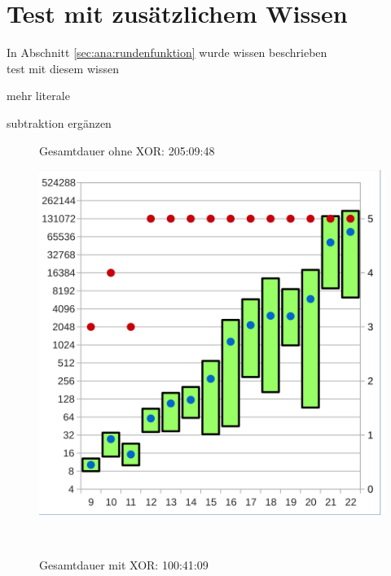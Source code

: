 \section{Test mit zusätzlichem Wissen}

In Abschnitt \ref{sec:ana:rundenfunktion} wurde wissen beschrieben\\
test mit diesem wissen

mehr literale

subtraktion ergänzen


\begin{figure}[!h]
  \centering
  \begin{minipage}[c]{0.45\textwidth}
  \begin{flushleft}Gesamtdauer ohne XOR: 205:09:48\end{flushleft}
  \includegraphics[scale=0.55]{images/data_know_knf}
  \end{minipage}
  \begin{minipage}[c]{0.09\textwidth}
  ~~
  \end{minipage}
  \begin{minipage}[c]{0.45\textwidth}
  \begin{flushleft}Gesamtdauer mit XOR: 100:41:09\end{flushleft}

\end{minipage}
\end{figure}
